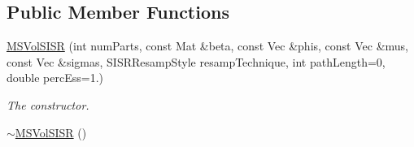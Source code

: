 \subsection*{Public Member Functions}
\begin{DoxyCompactItemize}
\item 
\hyperlink{classMSVolSISR_a036830dc21a366c40a083ddf4c3344ae}{M\+S\+Vol\+S\+I\+SR} (int num\+Parts, const Mat \&beta, const Vec \&phis, const Vec \&mus, const Vec \&sigmas, S\+I\+S\+R\+Resamp\+Style resamp\+Technique, int path\+Length=0, double perc\+Ess=1.)
\begin{DoxyCompactList}\small\item\em The constructor. \end{DoxyCompactList}\item 
\hyperlink{classMSVolSISR_a5e1706e6f5ea33e9c3cf7a1d58485690}{$\sim$\+M\+S\+Vol\+S\+I\+SR} ()\hypertarget{classMSVolSISR_a5e1706e6f5ea33e9c3cf7a1d58485690}{}\label{classMSVolSISR_a5e1706e6f5ea33e9c3cf7a1d58485690}


\end{DoxyCompactItemize}
